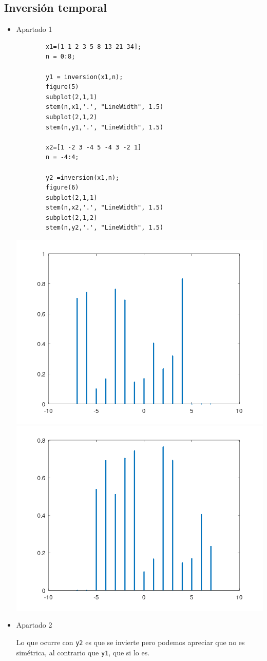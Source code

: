 \documentclass{article}
\begin{document}
\subsection{Inversión temporal}
\begin{itemize}
	\item Apartado 1
	\begin{lstlisting}
		x1=[1 1 2 3 5 8 13 21 34];
		n = 0:8;
		
		y1 = inversion(x1,n);
		figure(5)
		subplot(2,1,1)
		stem(n,x1,'.', "LineWidth", 1.5)
		subplot(2,1,2)
		stem(n,y1,'.', "LineWidth", 1.5)
		
		x2=[1 -2 3 -4 5 -4 3 -2 1]
		n = -4:4;
		
		y2 =inversion(x1,n);
		figure(6)
		subplot(2,1,1)
		stem(n,x2,'.', "LineWidth", 1.5)
		subplot(2,1,2)
		stem(n,y2,'.', "LineWidth", 1.5)
	\end{lstlisting}
	
	\begin{center}
			\includegraphics[width=0.45\linewidth]{Imagénes/figure5}
		\qquad
		\includegraphics[width=0.45\linewidth]{Imagénes/figure6}
	\end{center}
	\item Apartado 2
	
	Lo que ocurre con \texttt{y2} es que se invierte pero podemos apreciar que no es simétrica, al contrario que \texttt{y1}, que si lo es.
\end{itemize}
\end{document}
